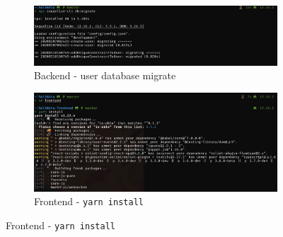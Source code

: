 \documentclass[12pt]{article}
\renewcommand{\_}{\kern-1.5pt\textunderscore\kern-1.5pt}
\begin{document}
\begin{figure}[H]
\begin{minipage}[c]{0.5\linewidth}
\begin{subfigure}[b]{\textwidth}
		\end{subfigure}
		\begin{subfigure}[b]{\textwidth}
			\centering
			\includegraphics[width=\textwidth]{graphs/03. user_db_migrate}
			\caption{Backend - user database migrate}
		\end{subfigure}
			\begin{subfigure}[b]{\textwidth}
			\centering
			\includegraphics[width=\textwidth]{graphs/04. yarn_install_frontend}
			\caption{Frontend - \texttt{yarn install}}
		\end{subfigure}
	\end{minipage}
\end{figure}
\end{document}
